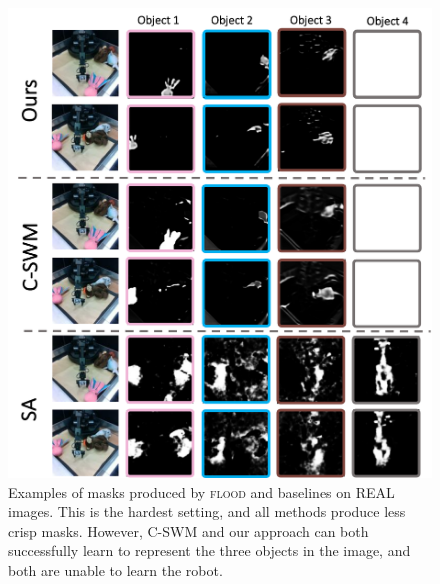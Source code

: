 \documentclass{article}
\newcommand{\jd}[1]{\textcolor{orange}{[DJ: #1]}}
\begin{document}
\begin{figure}
  \centering
  \includegraphics[height=0.45\textheight]{figs/qual_real.pdf}
  \caption{Examples of masks produced by \textsc{flood} and baselines on REAL images. This is the hardest setting, and all methods produce less crisp masks. However, C-SWM and our approach can both successfully learn to represent the three objects in the image, and both are unable to learn the robot.}
  \label{fig:qual_real}
\end{figure}





\end{document}
